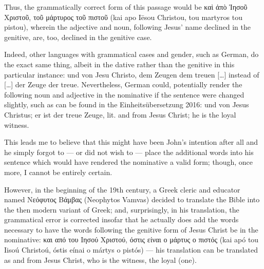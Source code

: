Thus, the grammatically correct form of this passage would be καὶ ἀπὸ Ἰησοῦ Χριστοῦ, τοῦ μάρτυρος τοῦ πιστοῦ (kai apo Iēsou Christou, tou martyros tou pistou), wherein the adjective and noun, following Jesus’ name declined in the genitive, are, too, declined in the genitive case.

Indeed, other languages with grammatical cases and gender, such as German, do the exact same thing, albeit in the dative rather than the genitive in this particular instance: und von Jesu Christo, dem Zeugen dem treuen […] instead of […] der Zeuge der treue. Nevertheless, German could, potentially render the following noun and adjective in the nominative if the sentence were changed slightly, such as can be found in the Einheitsübersetzung 2016: und von Jesus Christus; er ist der treue Zeuge, lit. and from Jesus Christ; he is the loyal witness.

This leads me to believe that this might have been John’s intention after all and he simply forgot to — or did not wish to — place the additional words into his sentence which would have rendered the nominative a valid form; though, once more, I cannot be entirely certain.

However, in the beginning of the 19th century, a Greek cleric and educator named Νεόφυτος Βάμβας (Neophytos Vamvas) decided to translate the Bible into the then modern variant of Greek; and, surprisingly, in his translation, the grammatical error is corrected insofar that he actually does add the words necessary to have the words following the genitive form of Jesus Christ be in the nominative: και από του Ιησού Χριστού, όστις είναι ο μάρτυς ο πιστός (kai apó tou Iisoú Christoú, óstis eínai o mártys o pistós) — his translation can be translated as and from Jesus Christ, who is the witness, the loyal (one).

